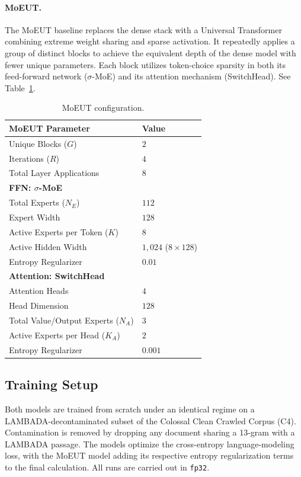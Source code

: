 \documentclass[11pt]{article}
\begin{document}
\paragraph{MoEUT.} 
The MoEUT baseline replaces the dense stack with a Universal Transformer combining extreme weight sharing and sparse activation.
It repeatedly applies a group of distinct blocks to achieve the equivalent depth of the dense model with fewer unique parameters.
Each block utilizes token-choice sparsity in both its feed-forward network ($\sigma$-MoE) and its attention mechanism (SwitchHead).
See Table~\ref{tab:moeut_params}.
\begin{table}[htbp]
  \centering
  \small
  \begin{tabular}{ll}
    \toprule
    \textbf{MoEUT Parameter} & \textbf{Value} \\
    \midrule
    Unique Blocks ($G$) & $2$ \\
    Iterations ($R$) & $4$ \\
    Total Layer Applications & $8$ \\
    \midrule
    \textbf{FFN: $\sigma$-MoE} & \\
    Total Experts ($N_E$) & $112$ \\
    Expert Width & $128$ \\
    Active Experts per Token ($K$) & $8$ \\
    Active Hidden Width & $1{,}024$ ($8 \times 128$) \\
    Entropy Regularizer & $0.01$ \\
    \midrule
    \textbf{Attention: SwitchHead} & \\
    Attention Heads & $4$ \\
    Head Dimension & $128$ \\
    Total Value/Output Experts ($N_A$) & $3$ \\
    Active Experts per Head ($K_A$) & $2$ \\
    Entropy Regularizer & $0.001$ \\
    \bottomrule
  \end{tabular}
  \caption{MoEUT configuration.}
  \label{tab:moeut_params}
\end{table}

\subsection{Training Setup}
Both models are trained from scratch under an identical regime on a LAMBADA-decontaminated subset of the Colossal Clean Crawled Corpus (C4). Contamination is removed by dropping any document sharing a 13-gram with a LAMBADA passage. The models optimize the cross-entropy language-modeling loss, with the MoEUT model adding its respective entropy regularization terms to the final calculation. All runs are carried out in \texttt{fp32}.
\end{document}
